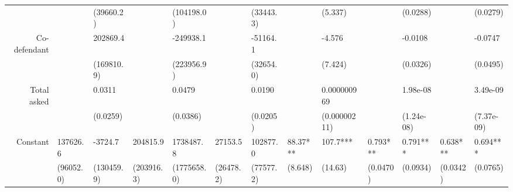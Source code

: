 \begin{tabular}{rrrrrrrrrrrrr}
      & \multicolumn{1}{l}{} & \multicolumn{1}{l}{(39660.2)} & \multicolumn{1}{l}{} & \multicolumn{1}{l}{(104198.0)} & \multicolumn{1}{l}{} & \multicolumn{1}{l}{(33443.3)} & \multicolumn{1}{l}{} & \multicolumn{1}{l}{(5.337)} & \multicolumn{1}{l}{} & \multicolumn{1}{l}{(0.0288)} & \multicolumn{1}{l}{} & \multicolumn{1}{l}{(0.0279)} \\
Co-defendant & \multicolumn{1}{l}{} & \multicolumn{1}{l}{202869.4} & \multicolumn{1}{l}{} & \multicolumn{1}{l}{-249938.1} & \multicolumn{1}{l}{} & \multicolumn{1}{l}{-51164.1} & \multicolumn{1}{l}{} & \multicolumn{1}{l}{-4.576} & \multicolumn{1}{l}{} & \multicolumn{1}{l}{-0.0108} & \multicolumn{1}{l}{} & \multicolumn{1}{l}{-0.0747} \\
      & \multicolumn{1}{l}{} & \multicolumn{1}{l}{(169810.9)} & \multicolumn{1}{l}{} & \multicolumn{1}{l}{(223956.9)} & \multicolumn{1}{l}{} & \multicolumn{1}{l}{(32654.0)} & \multicolumn{1}{l}{} & \multicolumn{1}{l}{(7.424)} & \multicolumn{1}{l}{} & \multicolumn{1}{l}{(0.0326)} & \multicolumn{1}{l}{} & \multicolumn{1}{l}{(0.0495)} \\
Total asked & \multicolumn{1}{l}{} & \multicolumn{1}{l}{0.0311} & \multicolumn{1}{l}{} & \multicolumn{1}{l}{0.0479} & \multicolumn{1}{l}{} & \multicolumn{1}{l}{0.0190} & \multicolumn{1}{l}{} & \multicolumn{1}{l}{0.000000969} & \multicolumn{1}{l}{} & \multicolumn{1}{l}{1.98e-08} & \multicolumn{1}{l}{} & \multicolumn{1}{l}{3.49e-09} \\
      & \multicolumn{1}{l}{} & \multicolumn{1}{l}{(0.0259)} & \multicolumn{1}{l}{} & \multicolumn{1}{l}{(0.0386)} & \multicolumn{1}{l}{} & \multicolumn{1}{l}{(0.0205)} & \multicolumn{1}{l}{} & \multicolumn{1}{l}{(0.00000211)} & \multicolumn{1}{l}{} & \multicolumn{1}{l}{(1.24e-08)} & \multicolumn{1}{l}{} & \multicolumn{1}{l}{(7.37e-09)} \\
Constant & \multicolumn{1}{l}{137626.6} & \multicolumn{1}{l}{-3724.7} & \multicolumn{1}{l}{204815.9} & \multicolumn{1}{l}{1738487.8} & \multicolumn{1}{l}{27153.5} & \multicolumn{1}{l}{102877.0} & \multicolumn{1}{l}{88.37***} & \multicolumn{1}{l}{107.7***} & \multicolumn{1}{l}{0.793***} & \multicolumn{1}{l}{0.791***} & \multicolumn{1}{l}{0.638***} & \multicolumn{1}{l}{0.694***} \\
      & \multicolumn{1}{l}{(96052.0)} & \multicolumn{1}{l}{(130459.9)} & \multicolumn{1}{l}{(203916.3)} & \multicolumn{1}{l}{(1775658.0)} & \multicolumn{1}{l}{(26478.2)} & \multicolumn{1}{l}{(77577.2)} & \multicolumn{1}{l}{(8.648)} & \multicolumn{1}{l}{(14.63)} & \multicolumn{1}{l}{(0.0470)} & \multicolumn{1}{l}{(0.0934)} & \multicolumn{1}{l}{(0.0342)} & \multicolumn{1}{l}{(0.0765)} \\

\end{tabular}
